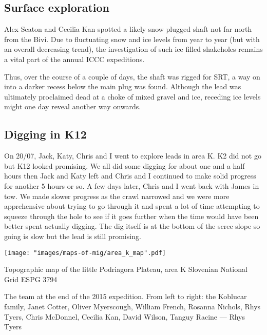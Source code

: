 \subsection{Surface exploration}
Alex Seaton and Cecilia Kan spotted a likely snow plugged shaft not far north from the Bivi. Due to fluctuating snow and ice levels from year to year (but with an overall decreasing trend), the investigation of such ice filled shakeholes remains a vital part of the annual ICCC expeditions. 

Thus, over the course of a couple of days, the shaft was rigged for SRT, a way on into a darker recess below the main plug was found. Although the lead was ultimately proclaimed dead at a choke of mixed gravel and ice, receding ice levels might one day reveal another way onwards. 

\subsection{Digging in K12}

On 20/07, Jack, Katy, Chris and I went to explore leads in area K. K2 did not go but K12 looked promising.  We all did some digging for about one and a half hours then Jack and Katy left and Chris and I continued to make solid progress for another 5 hours or so. A few days later, Chris and I went back with James in tow. We made slower progress as the crawl narrowed and we were more apprehensive about trying to go through it and spent a lot of time attempting to squeeze through the hole to see if it goes further when the time would have been better spent actually digging. The dig itself is at the bottom of the scree slope so going is slow but the lead is still promising. 

 \begin{map}
 \checkoddpage \ifoddpage \forcerectofloat \else \forceversofloat \fi
\centering
  \texttt{[image: "images/maps-of-mig/area\_k\_map".pdf]}
  
  \caption{Topographic map of the little Podriagora Plateau, area K Slovenian National Grid ESPG 3794}
  \label{map:map area K}
 \end{map}
 
\newpage

\begin{pagefigure}
\centering
{}
\caption{The team at the end of the 2015 expedition. From left to right: the Koblucar family, Janet Cotter, Oliver Myerscough, William French, Rosanna Nichols, Rhys Tyers, Chris McDonnel, Cecilia Kan, David Wilson, Tanguy Racine --- Rhys Tyers}
\label{}
\end{pagefigure}


